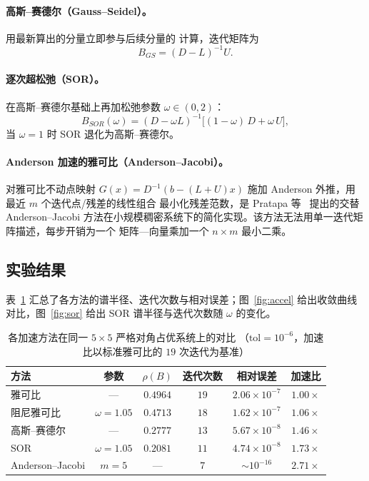 \documentclass[12pt,a4paper]{ctexart}
\begin{document}
\paragraph{高斯--赛德尔（Gauss--Seidel）。}用最新算出的分量立即参与后续分量的
计算，迭代矩阵为
\begin{equation}
  B_{GS} = (D-L)^{-1}U.
\end{equation}

\paragraph{逐次超松弛（SOR）。}在高斯--赛德尔基础上再加松弛参数
$\omega\in(0,2)$：
\begin{equation}
  B_{SOR}(\omega) = (D-\omega L)^{-1}\bigl[(1-\omega)\,D + \omega\, U\bigr],
\end{equation}
当 $\omega=1$ 时 SOR 退化为高斯--赛德尔。

\paragraph{Anderson 加速的雅可比（Anderson--Jacobi）。}对雅可比不动点映射
$G(x)=D^{-1}(b-(L+U)x)$ 施加 Anderson 外推，用最近 $m$ 个迭代点/残差的线性组合
最小化残差范数，是 Pratapa 等~\cite{pratapa2015} 提出的交替 Anderson--Jacobi
方法在小规模稠密系统下的简化实现。该方法无法用单一迭代矩阵描述，每步开销为一个
矩阵—向量乘加一个 $n\times m$ 最小二乘。

\subsection{实验结果}

表~\ref{tab:accel} 汇总了各方法的谱半径、迭代次数与相对误差；图~\ref{fig:accel}
给出收敛曲线对比，图~\ref{fig:sor} 给出 SOR 谱半径与迭代次数随 $\omega$ 的变化。

\begin{table}[htbp]
  \centering
  \caption{各加速方法在同一 $5\times5$ 严格对角占优系统上的对比
    （$\mathrm{tol}=10^{-6}$，加速比以标准雅可比的 $19$ 次迭代为基准）}
  \label{tab:accel}
  \begin{tabular}{lccccc}
    \toprule
    方法 & 参数 & $\rho(B)$ & 迭代次数 & 相对误差 & 加速比 \\
    \midrule
    雅可比 & — & $0.4964$ & $19$ & $2.06\times10^{-7}$ & $1.00\times$ \\
    阻尼雅可比 & $\omega=1.05$ & $0.4713$ & $18$ & $1.62\times10^{-7}$ & $1.06\times$ \\
    高斯--赛德尔 & — & $0.2777$ & $13$ & $5.67\times10^{-8}$ & $1.46\times$ \\
    SOR & $\omega=1.05$ & $0.2081$ & $11$ & $4.74\times10^{-8}$ & $1.73\times$ \\
    Anderson--Jacobi & $m=5$ & — & $7$ & $\sim10^{-16}$ & $2.71\times$ \\
    \bottomrule
  \end{tabular}
\end{table}
\end{document}
